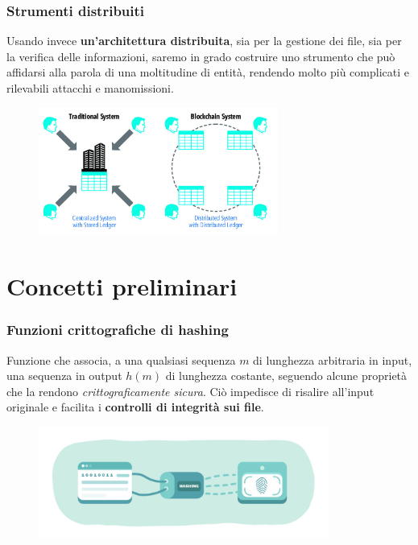 \documentclass{beamer}
\begin{document}
\begin{frame}
	\frametitle{Strumenti distribuiti}
		Usando invece \textbf{un'architettura distribuita}, sia per la gestione dei file,
		sia per la verifica delle informazioni, saremo in grado costruire uno strumento
		che può affidarsi alla parola di una moltitudine di entità, rendendo molto
		più complicati e rilevabili attacchi e manomissioni.
	\medskip
	\begin{figure}
		\includegraphics[width=0.70\textwidth]{dece.jpg}
	\end{figure}
\end{frame}

\section{Concetti preliminari}
\begin{frame}
	\frametitle{Funzioni crittografiche di hashing}
	Funzione che associa,
	a una qualsiasi sequenza \(m\) di lunghezza arbitraria in input, una sequenza
	in output \(h(m)\) di lunghezza costante,
	seguendo alcune proprietà che la rendono
	\emph{crittograficamente sicura}.
	Ciò impedisce di risalire all'input originale
	e facilita i \textbf{controlli di integrità sui file}.
	\begin{figure}
		\includegraphics[width=0.85\textwidth]{figures/hashing.jpg}
	\end{figure}
\end{frame}
\end{document}
